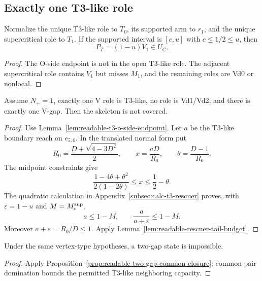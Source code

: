 \subsection{Exactly one T3-like role}

\begin{lemma}
\label{lem:readable-t3-o-side-endpoint}
Normalize the unique T3-like role to $T_0$, its supported arm to $r_1$, and
the unique supercritical role to $T_1$.  If the supported interval is
$[c,u]$ with $c\le1/2\le u$, then
\[
 P_T=(1-u)V_1\in U_C.
\]
\end{lemma}



\begin{proof}
The O-side endpoint is not in the open T3-like role.  The adjacent
supercritical role contains $V_1$ but misses $M_1$, and the remaining roles
are Vd0 or nonlocal.
\end{proof}

\begin{proposition}
\label{prop:readable-one-t3-one-gap}
Assume $N_+=1$, exactly one V role is T3-like, no role is Vd1/Vd2, and
there is exactly one V-gap.  Then the skeleton is not covered.
\end{proposition}

\begin{proof}
Use Lemma~\ref{lem:readable-t3-o-side-endpoint}.  Let $a$ be the T3-like
boundary reach on $e_{5,0}$.  In the translated normal form put
\[
 R_0=\frac{D+\sqrt{4-3D^2}}2,\qquad
 x=\frac{aD}{R_0},\qquad
 \theta=\frac{D-1}{R_0}.
\]
The midpoint constraints give
\[
 \frac{1-4\theta+\theta^2}{2(1-2\theta)}
 \le x\le\frac12-\theta.
\]
The quadratic calculation in Appendix~\ref{subsec:calc-t3-rescuer} proves,
with $\varepsilon=1-u$ and $M=M_c^{\rm sup}$,
\[
 a\le1-M,\qquad
 \frac{a}{a+\varepsilon}\le1-M.
\]
Moreover $a+\varepsilon=R_0/D\le1$.  Apply
Lemma~\ref{lem:readable-rescuer-tail-budget}.
\end{proof}

\begin{proposition}
\label{prop:readable-one-t3-two-gap}
Under the same vertex-type hypotheses, a two-gap state is impossible.
\end{proposition}

\begin{proof}
Apply Proposition~\ref{prop:readable-two-gap-common-closure}; common-pair
domination bounds the permitted T3-like neighboring capacity.
\end{proof}

